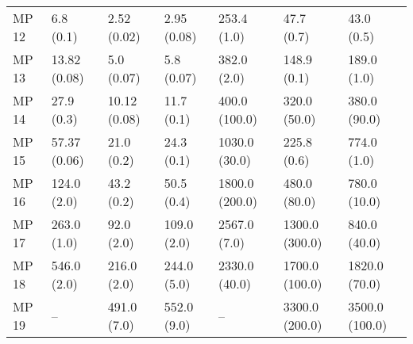 \begin{tabular}{lllllll}
MP 12 &         6.8 (0.1) &        2.52 (0.02) &           2.95 (0.08) &             253.4 (1.0) &               47.7 (0.7) &                  43.0 (0.5) \\
MP 13 &      13.82 (0.08) &         5.0 (0.07) &            5.8 (0.07) &             382.0 (2.0) &              148.9 (0.1) &                 189.0 (1.0) \\
MP 14 &        27.9 (0.3) &       10.12 (0.08) &            11.7 (0.1) &           400.0 (100.0) &             320.0 (50.0) &                380.0 (90.0) \\
MP 15 &      57.37 (0.06) &         21.0 (0.2) &            24.3 (0.1) &           1030.0 (30.0) &              225.8 (0.6) &                 774.0 (1.0) \\
MP 16 &       124.0 (2.0) &         43.2 (0.2) &            50.5 (0.4) &          1800.0 (200.0) &             480.0 (80.0) &                780.0 (10.0) \\
MP 17 &       263.0 (1.0) &         92.0 (2.0) &           109.0 (2.0) &            2567.0 (7.0) &           1300.0 (300.0) &                840.0 (40.0) \\
MP 18 &       546.0 (2.0) &        216.0 (2.0) &           244.0 (5.0) &           2330.0 (40.0) &           1700.0 (100.0) &               1820.0 (70.0) \\
MP 19 &                -- &        491.0 (7.0) &           552.0 (9.0) &                      -- &           3300.0 (200.0) &              3500.0 (100.0) \\
\bottomrule
\end{tabular}
